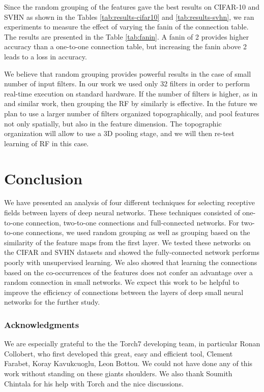 \documentclass{article} %
\begin{document}
Since the random grouping of the features gave the best results on CIFAR-10 and SVHN as shown in the Tables \ref{tab:results-cifar10} and \ref{tab:results-svhn}, we ran experiments to measure the effect of varying the fanin of the connection table.
The results are presented in the Table \ref{tab:fanin}. A fanin of 2 provides higher accuracy than a one-to-one connection table, but increasing the fanin above 2 leads to a loss in accuracy.

We believe that random grouping provides powerful results in the case of small number of input filters. In our work we used only 32 filters in order to perform real-time execution on standard hardware. If the number of filters is higher, as in  \cite{coates2012learning} and similar work, then grouping the RF by similarly is effective. In the future we plan to use a larger number of filters organized topographically, and pool features not only spatially, but also in the feature dimension. The topographic organization will allow to use a 3D pooling stage, and we will then re-test learning of RF in this case.


\section{Conclusion}
\label{sec-conc}

We have presented an analysis of four different techniques for selecting receptive fields between layers of deep neural networks.
These techniques consisted of one-to-one connection, two-to-one connections and full-connected networks.
For two-to-one connections, we used random grouping as well as grouping based on the similarity of the feature maps from the first layer.  We tested these networks on the CIFAR and SVHN datasets and showed the fully-connected network performs poorly with unsupervised learning. We also showed that learning the connections based on the co-occurrences of  the features does not confer an advantage over a random connection in small networks.
We expect this work to be helpful to improve the efficiency of connections between the layers of deep small neural networks for the further study.


\subsubsection*{Acknowledgments}
We are especially grateful to the the Torch7 developing team, in particular Ronan Collobert, who first developed this great, easy and efficient tool,
Clement Farabet, Koray Kavukcuoglu, Leon Bottou.
We could not have done any of this work without standing on these giants shoulders.
We also thank Soumith Chintala for his help with Torch and the nice discussions.



\end{document}
